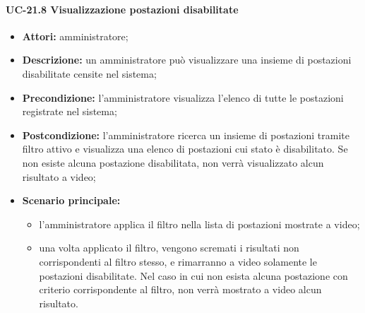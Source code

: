 \paragraph{UC-21.8 Visualizzazione postazioni disabilitate}
\begin{itemize}
    \item \textbf{Attori:} amministratore;
    \item \textbf{Descrizione:} un amministratore pu\`{o} visualizzare una insieme di postazioni disabilitate censite nel sistema;
    \item \textbf{Precondizione:} l'amministratore visualizza l'elenco di tutte le postazioni registrate nel sistema;
    \item \textbf{Postcondizione:} l'amministratore ricerca un insieme di postazioni tramite filtro attivo e visualizza una elenco di postazioni cui stato è disabilitato. Se non esiste alcuna postazione disabilitata, non verrà visualizzato alcun risultato a video;
    \item \textbf{Scenario principale:}
    \begin{itemize}
        \item l'amministratore applica il filtro nella lista di postazioni mostrate a video;
        \item una volta applicato il filtro, vengono scremati i risultati non corrispondenti al filtro stesso, e rimarranno a video solamente le postazioni disabilitate. Nel caso in cui non esista alcuna postazione con criterio corrispondente al filtro, non verrà mostrato a video alcun risultato.
    \end{itemize}
\end{itemize}
    
